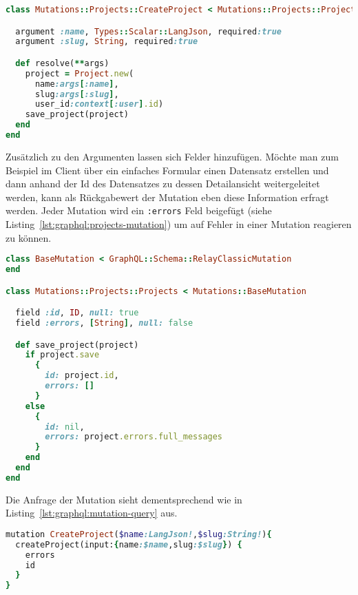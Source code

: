 \begin{lstlisting}[language=Ruby,float=h!,caption={Definition der Mutation CreateProject \lstinline|/graphql/mutations/projects/create_project.rb|}, label={lst:graphql:create_project}]
class Mutations::Projects::CreateProject < Mutations::Projects::Projects

  argument :name, Types::Scalar::LangJson, required:true
  argument :slug, String, required:true

  def resolve(**args)
    project = Project.new(
      name:args[:name],
      slug:args[:slug],
      user_id:context[:user].id)
    save_project(project)
  end
end
\end{lstlisting}

Zusätzlich zu den Argumenten lassen sich Felder hinzufügen. Möchte man zum Beispiel im Client über ein einfaches Formular einen Datensatz erstellen und dann anhand der Id des Datensatzes zu dessen Detailansicht weitergeleitet werden, kann als Rückgabewert der Mutation eben diese Information erfragt werden.
Jeder Mutation wird ein \texttt{:errors} Feld beigefügt (siehe Listing~\ref{lst:graphql:projects-mutation}) um auf Fehler in einer Mutation reagieren zu können.

\begin{lstlisting}[language=Ruby,float=h!,caption={Definition der Oberklasse aller projects Mutationen \lstinline|/graphql/mutations/projects/projects.rb|}, label={lst:graphql:projects-mutation}]
class BaseMutation < GraphQL::Schema::RelayClassicMutation
end

class Mutations::Projects::Projects < Mutations::BaseMutation

  field :id, ID, null: true
  field :errors, [String], null: false

  def save_project(project)
    if project.save
      {
        id: project.id,
        errors: []
      }
    else
      {
        id: nil,
        errors: project.errors.full_messages
      }
    end
  end
end
\end{lstlisting}

Die Anfrage der Mutation sieht dementsprechend wie in Listing~\ref{lst:graphql:mutation-query} aus.

\begin{lstlisting}[language=Ruby,float=h!,caption={Anfrage der CreateProject Mutation}, label={lst:graphql:mutation-query}] 
mutation CreateProject($name:LangJson!,$slug:String!){
  createProject(input:{name:$name,slug:$slug}) {
    errors
	id
  }
}
\end{lstlisting}

